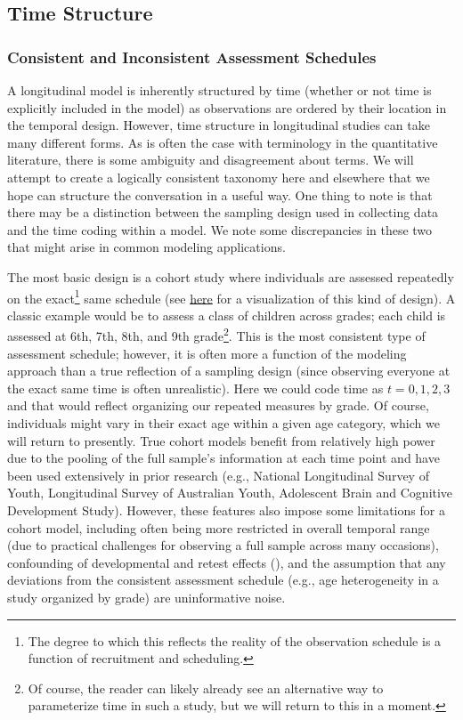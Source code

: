 \documentclass[11pt]{article}
\begin{document}
\subsection{Time Structure}
\subsubsection{Consistent and Inconsistent Assessment Schedules}
A longitudinal model is inherently structured by time (whether or not time is explicitly included in the model) as observations are ordered by their location in the temporal design. However, time structure in longitudinal studies can take many different forms. As is often the case with terminology in the quantitative literature, there is some ambiguity and disagreement about terms. We will attempt to create a logically consistent taxonomy here and elsewhere that we hope can structure the conversation in a useful way. One thing to note is that there may be a distinction between the sampling design used in collecting data and the time coding within a model. We note some discrepancies in these two that might arise in common modeling applications.

The most basic design is a cohort study where individuals are assessed repeatedly on the exact\footnote{The degree to which this reflects the reality of the observation schedule is a function of recruitment and scheduling.} same schedule (see \href{https://e-m-mccormick.github.io/static/longitudinal-primer/03-time.html#single-cohort-data}{here} for a visualization of this kind of design). A classic example would be to assess a class of children across grades; each child is assessed at 6th, 7th, 8th, and 9th grade\footnote{Of course, the reader can likely already see an alternative way to parameterize time in such a study, but we will return to this in a moment.}. This is the most consistent type of assessment schedule; however, it is often more a function of the modeling approach than a true reflection of a sampling design (since observing everyone at the exact same time is often unrealistic). Here we could code time as $t = 0, 1, 2, 3$ and that would reflect organizing our repeated measures by grade. Of course, individuals might vary in their exact age within a given age category, which we will return to presently. True cohort models benefit from relatively high power due to the pooling of the full sample’s information at each time point and have been used extensively in prior research (e.g., National Longitudinal Survey of Youth, Longitudinal Survey of Australian Youth, Adolescent Brain and Cognitive Development Study). However, these features also impose some limitations for a cohort model, including often being more restricted in overall temporal range (due to practical challenges for observing a full sample across many occasions), confounding of developmental and retest effects (\cite{ferrer_modeling_2004,mccormick_multi-level_2021}), and the assumption that any deviations from the consistent assessment schedule (e.g., age heterogeneity in a study organized by grade) are uninformative noise.
\end{document}
